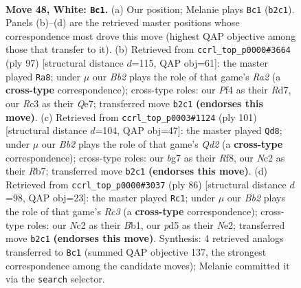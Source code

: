 \documentclass[11pt]{article}
\begin{document}
\clearpage

\begin{figure}[p]\centering
\begin{subfigure}{0.46\textwidth}\centering
\resizebox{\linewidth}{!}{%
\newchessgame
\chessboard[
  setfen={rn1qk1r1/4n1b1/2p3p1/3p2P1/3P1P1p/1PR4P/1BNQBK2/7R w - - 25 48},
  showmover=false,
  pgfstyle=straightmove, color=movearrow, markmove={b2-c1}
]}
\caption{}
\end{subfigure}\hfill
\begin{subfigure}{0.46\textwidth}\centering
\resizebox{\linewidth}{!}{%
\newchessgame
\chessboard[
  setfen={6k1/r2rqp2/1pbpn1p1/7p/1PP1Pp1P/1B1R1N2/1Q3PP1/4R1K1 b - - 28 49},
  showmover=false,
  pgfstyle=straightmove, color=movearrow, markmove={a7-a8}
]}
\caption{}
\end{subfigure}
\\[4pt]
\begin{subfigure}{0.46\textwidth}\centering
\resizebox{\linewidth}{!}{%
\newchessgame
\chessboard[
  setfen={5r2/1r1q2bk/n2p2p1/1p1Pp1Pp/4P3/PR1N3P/2R1QNK1/8 b - - 5 51},
  showmover=false,
  pgfstyle=straightmove, color=movearrow, markmove={d7-d8}
]}
\caption{}
\end{subfigure}\hfill
\begin{subfigure}{0.46\textwidth}\centering
\resizebox{\linewidth}{!}{%
\newchessgame
\chessboard[
  setfen={4q1k1/5pp1/p1b2n1r/1p2pP1n/1P2P2P/P1R1QN1K/4N3/1B6 w - - 6 44},
  showmover=false,
  pgfstyle=straightmove, color=movearrow, markmove={c3-c1}
]}
\caption{}
\end{subfigure}
\caption{\textbf{Move 48, White: \texttt{Bc1}.} (a) Our position; Melanie plays \texttt{Bc1} (\texttt{b2c1}). Panels (b)--(d) are the retrieved master positions whose correspondence most drove this move (highest QAP objective among those that transfer to it). (b) Retrieved from \texttt{ccrl\_top\_p0000\#3664} (ply 97) [structural distance $d$=115, QAP obj=61]: the master played \texttt{Ra8}; under $\mu$ our \emph{Bb2} plays the role of that game's \emph{Ra2} (a \textbf{cross-type} correspondence); cross-type roles: our \emph{P}f4 as their \emph{R}d7, our \emph{R}c3 as their \emph{Q}e7; transferred move \texttt{b2c1} \textbf{(endorses this move)}. (c) Retrieved from \texttt{ccrl\_top\_p0003\#1124} (ply 101) [structural distance $d$=104, QAP obj=47]: the master played \texttt{Qd8}; under $\mu$ our \emph{Bb2} plays the role of that game's \emph{Qd2} (a \textbf{cross-type} correspondence); cross-type roles: our \emph{b}g7 as their \emph{R}f8, our \emph{N}c2 as their \emph{R}b7; transferred move \texttt{b2c1} \textbf{(endorses this move)}. (d) Retrieved from \texttt{ccrl\_top\_p0000\#3037} (ply 86) [structural distance $d$=98, QAP obj=23]: the master played \texttt{Rc1}; under $\mu$ our \emph{Bb2} plays the role of that game's \emph{Rc3} (a \textbf{cross-type} correspondence); cross-type roles: our \emph{N}c2 as their \emph{B}b1, our \emph{p}d5 as their \emph{N}e2; transferred move \texttt{b2c1} \textbf{(endorses this move)}. Synthesis: 4 retrieved analogs transferred to \texttt{Bc1} (summed QAP objective 137, the strongest correspondence among the candidate moves); Melanie committed it via the \texttt{search} selector.}
\label{fig:thought-m94}
\end{figure}
\end{document}
